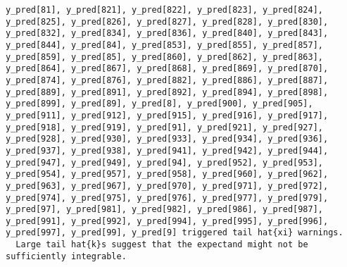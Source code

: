 \documentclass[
  letterpaper,
  DIV=11,
  numbers=noendperiod]{scrartcl}
\begin{document}
\begin{verbatim}
y_pred[81], y_pred[821], y_pred[822], y_pred[823], y_pred[824],
y_pred[825], y_pred[826], y_pred[827], y_pred[828], y_pred[830],
y_pred[832], y_pred[834], y_pred[836], y_pred[840], y_pred[843],
y_pred[844], y_pred[84], y_pred[853], y_pred[855], y_pred[857],
y_pred[859], y_pred[85], y_pred[860], y_pred[862], y_pred[863],
y_pred[864], y_pred[867], y_pred[868], y_pred[869], y_pred[870],
y_pred[874], y_pred[876], y_pred[882], y_pred[886], y_pred[887],
y_pred[889], y_pred[891], y_pred[892], y_pred[894], y_pred[898],
y_pred[899], y_pred[89], y_pred[8], y_pred[900], y_pred[905],
y_pred[911], y_pred[912], y_pred[915], y_pred[916], y_pred[917],
y_pred[918], y_pred[919], y_pred[91], y_pred[921], y_pred[927],
y_pred[928], y_pred[930], y_pred[933], y_pred[934], y_pred[936],
y_pred[937], y_pred[938], y_pred[941], y_pred[942], y_pred[944],
y_pred[947], y_pred[949], y_pred[94], y_pred[952], y_pred[953],
y_pred[954], y_pred[957], y_pred[958], y_pred[960], y_pred[962],
y_pred[963], y_pred[967], y_pred[970], y_pred[971], y_pred[972],
y_pred[974], y_pred[975], y_pred[976], y_pred[977], y_pred[979],
y_pred[97], y_pred[981], y_pred[982], y_pred[986], y_pred[987],
y_pred[991], y_pred[992], y_pred[994], y_pred[995], y_pred[996],
y_pred[997], y_pred[99], y_pred[9] triggered tail hat{xi} warnings.
  Large tail hat{k}s suggest that the expectand might not be
sufficiently integrable.
 

\end{verbatim}
\end{document}
